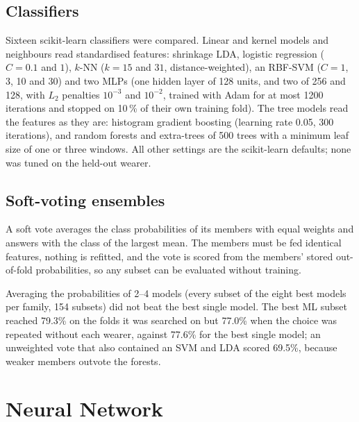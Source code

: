 \documentclass[conference]{IEEEtran}
\begin{document}
\subsection{Classifiers}
Sixteen scikit-learn classifiers were compared. Linear and kernel models and
neighbours read standardised features: shrinkage LDA, logistic regression
($C=0.1$ and $1$), $k$-NN ($k=15$ and $31$, distance-weighted), an RBF-SVM ($C=1$, 3,
10 and 30) and two MLPs (one hidden layer of 128 units, and two of 256 and 128, with
$L_2$ penalties $10^{-3}$ and $10^{-2}$, trained with Adam for at most 1200 iterations
and stopped on 10\,\% of their own training fold). The tree models read the features
as they are: histogram gradient boosting (learning rate 0.05, 300 iterations), and
random forests and extra-trees of 500 trees with a minimum leaf size of one or three
windows. All other settings are the scikit-learn defaults; none was tuned on the
held-out wearer.
\subsection{Soft-voting ensembles}
A soft vote averages the class probabilities of its members with equal weights and
answers with the class of the largest mean. The members must be fed identical
features, nothing is refitted, and the vote is scored from the members' stored
out-of-fold probabilities, so any subset can be evaluated without training.

Averaging the probabilities of 2--4 models (every subset of the
eight best models per family, 154 subsets) did not beat the best single model. The
best ML subset reached 79.3\% on the folds it was searched on but 77.0\% when the
choice was repeated without each wearer, against 77.6\% for the best single model; an
unweighted vote that also contained an SVM and LDA scored 69.5\%, because weaker
members outvote the forests.

\section{Neural Network}
\label{sec:nn}
\end{document}
